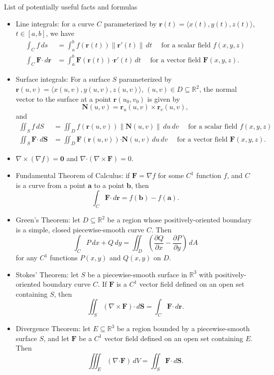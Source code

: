 \documentclass[12pt]{article}
\newcommand{\R}{\mathbb{R}}
\newcommand{\N}{\mathbf{N}}
\newcommand{\pd}[2]{\dfrac{\partial #1}{\partial #2}}
\newcommand{\dotp}{\boldsymbol{\cdot}}
\newcommand{\F}{\mathbf{F}}
\renewcommand{\S}{\mathbf{S}}
\renewcommand{\r}{\mathbf{r}}
\newcommand{\len}[1]{\left\lVert #1\right\rVert}
\begin{document}
\begin{center}
List of potentially useful facts and formulas
\end{center}
\begin{itemize}
\item Line integrals: for a curve $C$ parameterized by $\r(t) = \langle x(t),y(t),z(t)\rangle$, $t\in [a,b]$, we have
\begin{align*}
\int_C f\,ds &= \int_a^b f(\r(t))\len{\r'(t)}\,dt \quad \text{ for a scalar field } f(x,y,z)\\
\int_C \F\dotp\,d\r & = \int_a^b \F(\r(t))\dotp \r'(t)\,dt \quad \text{ for a vector field } \F(x,y,z).
\end{align*}

\item Surface integrals: For a surface $S$ parameterized by $\r(u,v) = \langle x(u,v), y(u,v), z(u,v)\rangle$, $(u,v)\in D\subseteq \R^2$, the normal vector to the surface at a point $\r(u_0,v_0)$ is given by
\[
\N(u,v) = \r_u(u,v)\times \r_v(u,v),
\]
and 
\begin{align*}
\iint_S f\,dS & = \iint_D f(\r(u,v))\len{\N(u,v)}\,du\,dv \quad \text{ for a scalar field } f(x,y,z)\\
\iint_S \F\dotp\,d\S & = \iint_D \F(\r(u,v))\dotp \N(u,v)\,du\,dv \quad \text{ for a vector field } \F(x,y,z).
\end{align*}

\item $\nabla\times (\nabla f) = \mathbf{0}$ and $\nabla \dotp (\nabla\times \F) = 0$.

\item Fundamental Theorem of Calculus: if $\F = \nabla f$ for some $C^1$ function $f$, and $C$ is a curve from a point $\mathbf{a}$ to a point $\mathbf{b}$, then
\[
\int_C \F\dotp \,d\r = f(\mathbf{b})-f(\mathbf{a}).
\]


\item Green's Theorem: let $D\subseteq \R^2$ be a region whose positively-oriented boundary is a simple, closed piecewise-smooth curve $C$. Then
\[
\int_C P\,dx+Q\,dy = \iint_D \left(\pd{Q}{x}-\pd{P}{y}\right)\,dA
\]
for any $C^1$ functions $P(x,y)$ and $Q(x,y)$ on $D$.

\item Stokes' Theorem: let $S$ be a piecewise-smooth surface in $\R^3$ with positively-oriented boundary curve $C$. If $\F$ is a $C^1$ vector field defined on an open set containing $S$, then
\[
\iint_S (\nabla\times \F)\dotp \,d\S = \int_C \F\dotp \,d\r.
\]

\item Divergence Theorem: let $E\subseteq \R^3$ be a region bounded by a piecewise-smooth surface $S$, and let $\F$ be a $C^1$ vector field defined on an open set containing $E$. Then
\[
\iiint_E (\nabla\dotp \F)\,dV = \iint_S \F\dotp \,d\S.
\]
\end{itemize}
\end{document}
